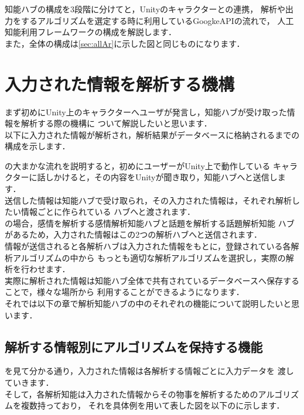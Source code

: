 
知能ハブの構成を3段階に分けてと，Unityのキャラクターとの連携，
解析や出力をするアルゴリズムを選定する時に利用しているGoogkeAPIの流れで，
人工知能利用フレームワークの構成を解説します．
\\
また，全体の構成は\ref{sec:allAr}に示した図と同じものになります．
\section{入力された情報を解析する機構}
まず初めにUnity上のキャラクターへユーザが発言し，知能ハブが受け取った情報を解析する際の機構に
ついて解説したいと思います．\\

以下に入力された情報が解析され，解析結果がデータベースに格納されるまでの
構成を示します．

の大まかな流れを説明すると，初めにユーザーがUnity上で動作している
キャラクターに話しかけると，その内容をUnityが聞き取り，知能ハブへと送信します．
\\
送信した情報は知能ハブで受け取られ，その入力された情報は，それぞれ解析したい情報ごとに作られている
ハブへと渡されます．
\\
の場合，感情を解析する感情解析知能ハブと話題を解析する話題解析知能
ハブがあるため，入力された情報はこの2つの解析ハブへと送信されます．
\\
情報が送信されると各解析ハブは入力された情報をもとに，登録されている各解析アルゴリズムの中から
もっとも適切な解析アルゴリズムを選択し，実際の解析を行わせます．
\\
実際に解析された情報は知能ハブ全体で共有されているデータベースへ保存することで，様々な場所から
利用することができるようになります．
\\

それでは以下の章で解析知能ハブの中のそれぞれの機能について説明したいと思います．


\subsection{解析する情報別にアルゴリズムを保持する機能}
を見て分かる通り，入力された情報は各解析する情報ごとに入力データを
渡していきます．
\\
そして，各解析知能は入力された情報からその物事を解析するためのアルゴリズムを複数持っており，
それを具体例を用いて表した図を以下のに示します．


